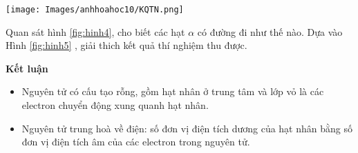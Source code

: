 \begin{center}
	\texttt{[image: Images/anhhoahoc10/KQTN.png]}\\
	\label{fig:hinh5}
\end{center}
%
\begin{hoivadap}
	\begin{cauhoi}
		Quan sát hình \ref{fig:hinh4}, cho biết các hạt $\alpha$ có đường đi như thế nào. Dựa vào Hình \ref{fig:hinh5} , giải thich kết quả thí nghiệm thu được.
	\end{cauhoi}
\end{hoivadap}
\begin{tomtat}
	{\bfseries{Kết luận}}
	\begin{itemize}
		\item Nguyên tử có cấu tạo rỗng, gồm hạt nhân ở trung tâm và lớp vỏ là các electron chuyển động xung quanh hạt nhân.
		\item Nguyên tử trung hoà về điện: số đơn vị điện tích dương của hạt nhân bằng số đơn vị điện tích âm của các electron trong nguyên tử.
	\end{itemize}
\end{tomtat}
